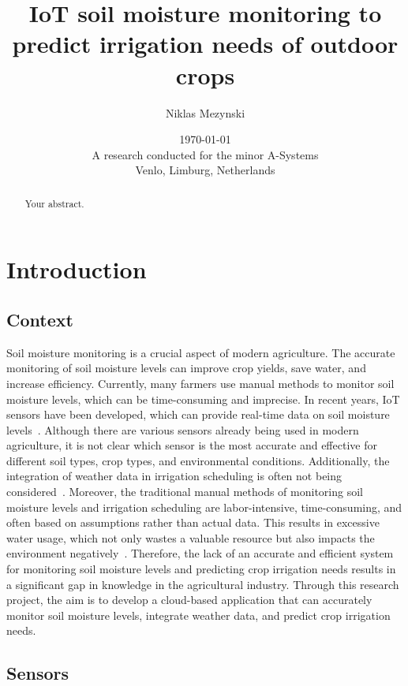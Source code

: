 \documentclass[]{report}
\title{IoT soil moisture monitoring to predict irrigation needs of outdoor crops}
\author{Niklas Mezynski}
\date{\today \\A research conducted for the minor A-Systems \\Venlo, Limburg, Netherlands}
\begin{document}
\maketitle

\begin{abstract}
    Your abstract.
\end{abstract}


\setcounter{tocdepth}{3}
\tableofcontents
\newpage

\listoffigures
\newpage

\listoftables
\newpage

\printnoidxglossaries
\cleardoublepage
{}
\setcounter{section}{1}

\section{Introduction}
\subsection{Context}
Soil moisture monitoring is a crucial aspect of modern agriculture. The accurate monitoring of soil moisture levels can improve crop yields, save water, and increase efficiency. Currently, many farmers use manual methods to monitor soil moisture levels, which can be time-consuming and imprecise. In recent years, IoT sensors have been developed, which can provide real-time data on soil moisture levels~\parencite{bwambale2022smart}.
\newline Although there are various sensors already being used in modern agriculture, it is not clear which sensor is the most accurate and effective for different soil types, crop types, and environmental conditions. Additionally, the integration of weather data in irrigation scheduling is often not being considered~\parencite{nandurkar2014design}.
\newline Moreover, the traditional manual methods of monitoring soil moisture levels and irrigation scheduling are labor-intensive, time-consuming, and often based on assumptions rather than actual data. This results in excessive water usage, which not only wastes a valuable resource but also impacts the environment negatively~\parencite{bwambale2022smart}.
\newline Therefore, the lack of an accurate and efficient system for monitoring soil moisture levels and predicting crop irrigation needs results in a significant gap in knowledge in the agricultural industry. Through this research project, the aim is to develop a cloud-based application that can accurately monitor soil moisture levels, integrate weather data, and predict crop irrigation needs.

\subsection{Sensors}


\printbibliography[title=References]
\end{document}
